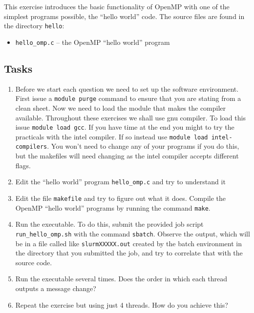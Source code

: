 \documentclass[a4paper, 12pt]{article}
\def \cc   {\tt }               %
\begin{document}
This exercise introduces the basic functionality of OpenMP with
one of the simplest programs possible, the ``hello world'' code.  The source
files are found in the directory {\cc hello}:
%
\begin{itemize}
  \item {\cc hello\_omp.c} -- the OpenMP ``hello world'' program 
\end{itemize}
%

\subsection*{Tasks}

\begin{enumerate}

  \item Before we start each question we need to set up the software 
    environment. First issue a {\cc module purge} command to ensure
    that you are stating from a clean sheet. Now we need to load
    the module that makes the compiler available.
    Throughout these exercises we shall use gnu compiler. To load this issue 
    {\cc module load gcc}. If you have time at the end
    you might to try the practicals with the intel
    compiler. If so instead use {\cc module load intel-compilers}.
    You won't need to change any of your programs if you do this, but the
    makefiles will need changing as the intel compiler accepts different flags.

  \item Edit the ``hello world'' program {\cc hello\_omp.c} and try to understand it

  \item Edit the file {\cc makefile} and try to figure out what it
    does.  Compile the OpenMP ``hello world'' programs by
    running the command {\cc make}.

  \item Run the executable.  To do this, submit the provided job
    script {\cc run\_hello\_omp.sh} with the command {\cc sbatch}.  Observe the
    output, which will be in a file called like {\cc slurmXXXXX.out} created by the batch environment in the directory that you submitted the job, and try to correlate that with the source code.

  \item Run the executable several times.  Does the order in which
    each thread outputs a message change?

  \item Repeat the exercise but using just 4 threads. How do you achieve this?

\end{enumerate}
\end{document}
